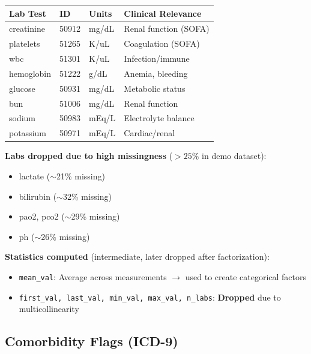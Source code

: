 \documentclass[11pt]{article}
\begin{document}
\begin{longtable}{L{3cm}L{1.5cm}L{2cm}L{6.5cm}}
\toprule
\textbf{Lab Test} & \textbf{ID} & \textbf{Units} & \textbf{Clinical Relevance} \\
\midrule
\endhead
creatinine & 50912 & mg/dL & Renal function (SOFA) \\
platelets & 51265 & K/uL & Coagulation (SOFA) \\
wbc & 51301 & K/uL & Infection/immune \\
hemoglobin & 51222 & g/dL & Anemia, bleeding \\
glucose & 50931 & mg/dL & Metabolic status \\
bun & 51006 & mg/dL & Renal function \\
sodium & 50983 & mEq/L & Electrolyte balance \\
potassium & 50971 & mEq/L & Cardiac/renal \\
\bottomrule
\end{longtable}

\textbf{Labs dropped due to high missingness} ($>25\%$ in demo dataset):
\begin{itemize}[leftmargin=*, nosep]
    \item lactate ($\sim$21\% missing)
    \item bilirubin ($\sim$32\% missing)
    \item pao2, pco2 ($\sim$29\% missing)
    \item ph ($\sim$26\% missing)
\end{itemize}

\textbf{Statistics computed} (intermediate, later dropped after factorization):
\begin{itemize}[leftmargin=*, nosep]
    \item \texttt{mean\_val}: Average across measurements $\to$ used to create categorical factors
    \item \texttt{first\_val, last\_val, min\_val, max\_val, n\_labs}: \textbf{Dropped} due to multicollinearity
\end{itemize}

\subsection{Comorbidity Flags (ICD-9)}
\end{document}
